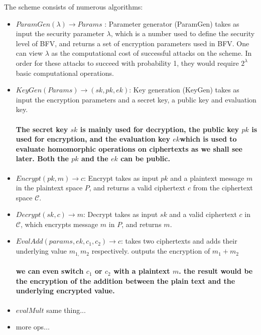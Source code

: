 The scheme consists of numerous algorithms:
\begin{itemize}
\item $ParamGen(\lambda)\to Params$ : Parameter generator (ParamGen) takes
as input the security parameter $\lambda$, which is a number used
to define the security level of BFV, and returns a set of encryption
parameters used in BFV. One can view $\lambda$ as the computational
cost of successful attacks on the scheme. In order for these attacks
to succeed with probability 1, they would require $2^{\lambda}$ basic
computational operations.
\item $KeyGen\left(Params\right)\to\left(sk,pk,ek\right)$: Key generation
(KeyGen) takes as input the encryption parameters and a secret key,
a public key and evaluation key. 

\paragraph{The secret key $sk$ is mainly used for decryption, the public key
$pk$ is used for encryption, and the evaluation key $ek$which is
used to evaluate homomorphic operations on ciphertexts as we shall
see later. Both the $pk$ and the $ek$ can be public.}
\item $Encrypt\left(pk,m\right)\to c$: Encrypt takes as input $pk$ and
a plaintext message $m$ in the plaintext space $P$, and returns
a valid ciphertext $c$ from the ciphertext space $\mathcal{C}$.
\item $Decrypt\left(sk,c\right)\to m$: Decrypt takes as input $sk$ and
a valid ciphertext $c$ in $\mathcal{C}$, which encrypts message
$m$ in $P$, and returns $m$.
\item $EvalAdd\left(params,ek,c_{1},c_{2}\right)\to c$: takes two ciphertexts
and adds their underlying value $m_{1,}m_{2}$ respectively. outputs
the encryption of $m_{1}+m_{2}$

\paragraph{we can even switch $c_{1}$ or $c_{2}$ with a plaintext $m$. the
result would be the encryption of the addition between the plain text
and the underlying encrypted value.}
\item $evalMult$ same thing...
\item more ops$\dots$
\end{itemize}

